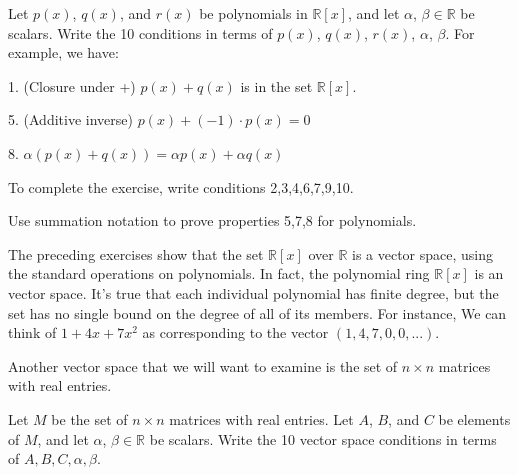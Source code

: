 \begin{exercise}{}
Let $p(x)$, $q(x)$, and $r(x)$ be polynomials in $\mathbb{R}[x]$, and let $\alpha$, $\beta\in\mathbb{R}$ be scalars.  Write the 10 conditions in terms of  $p(x)$, $q(x)$, $r(x)$, $\alpha$, $\beta$.  For example, we have:

1. (Closure under +) $p(x)+q(x)$ is in the set $\mathbb{R}[x]$.

5. (Additive inverse) $p(x)+(-1)\cdot p(x)=0$

8. $\alpha(p(x)+q(x))=\alpha p(x)+\alpha q(x)$

\noindent
To complete the exercise, write conditions 2,3,4,6,7,9,10. 
\end{exercise}

%

\begin{exercise}{}
Use summation notation to prove properties 5,7,8 for polynomials.
\end{exercise}

The preceding exercises show that  the set $\mathbb{R}[x]$ over $\mathbb{R}$ is a vector space, using the standard operations on polynomials. In fact, the polynomial ring $\mathbb{R}[x]$ is an  vector space. It's true that each individual polynomial has finite degree, but the set has no single bound on the degree of all of its members. For instance, We can think of $1 + 4x + 7x^2$ as corresponding to the vector $( 1, 4, 7, 0, 0,...)$.

Another vector space that we will want to examine is the set of $n \times n$ matrices with real entries.

\begin{exercise}{}
Let $M$ be the set of $n \times n$ matrices with real entries. Let $A$, $B$, and $C$ be elements of $M$, and let $\alpha$, $\beta\in\mathbb{R}$ be scalars.  Write the 10 vector space conditions in terms of  $A,B,C,\alpha,\beta$. 
\end{exercise}

